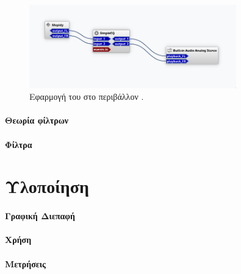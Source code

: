 \documentclass{article}
\begin{document}
\begin{figure}[htpb]
    \centering
    \includegraphics[width=0.8\textwidth]{./assets/Carla_Basic.png}
    \caption{Εφαρμογή του  στο περιβάλλον .}
    \label{fig:carla_basic}
\end{figure}

\paragraph{Θεωρία  φίλτρων}
\paragraph{Φίλτρα } 

\cite{Butteworth1930}

\section{Υλοποίηση}

\paragraph{Γραφική Διεπαφή}
\paragraph{Χρήση}
\paragraph{Μετρήσεις}


\end{document}
